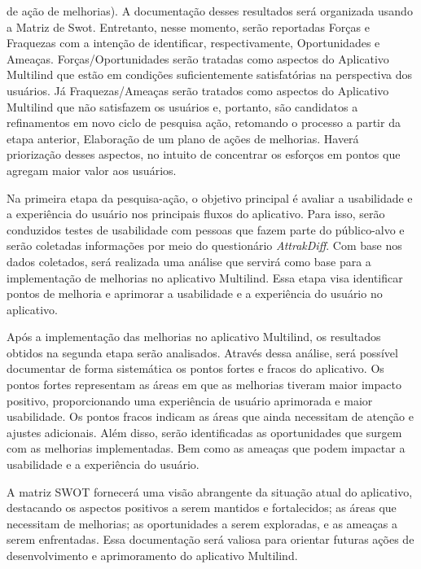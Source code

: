 \begin{itemize}
	de ação de melhorias). A documentação desses resultados será organizada usando a Matriz de Swot. Entretanto, nesse momento, serão reportadas Forças e Fraquezas com a intenção de identificar, respectivamente, Oportunidades e Ameaças. Forças/Oportunidades serão tratadas como aspectos do Aplicativo Multilind que estão em condições suficientemente satisfatórias na perspectiva dos usuários. Já Fraquezas/Ameaças serão tratados como aspectos do Aplicativo Multilind que não satisfazem os usuários e, portanto, são candidatos a refinamentos 
	em novo ciclo de pesquisa ação, retomando o processo a partir da etapa anterior, Elaboração de um plano de ações de melhorias. Haverá priorização desses aspectos, no intuito de concentrar os esforços em pontos que agregam maior valor aos usuários.
\end{itemize}

Na primeira etapa da pesquisa-ação, o objetivo principal é avaliar a usabilidade e a experiência do usuário nos principais fluxos do aplicativo. Para isso, serão conduzidos testes de usabilidade com pessoas que fazem parte do público-alvo e serão coletadas informações por meio do questionário \textit{AttrakDiff}. Com base nos dados coletados, será realizada uma análise que servirá como base para a implementação de melhorias no aplicativo Multilind. Essa etapa visa identificar pontos de melhoria e aprimorar a usabilidade e a experiência do 
usuário no aplicativo.

Após a implementação das melhorias no aplicativo Multilind, os resultados obtidos na segunda etapa serão analisados. Através dessa análise, será possível documentar de forma sistemática os pontos fortes e fracos do aplicativo. Os pontos fortes representam as áreas em que as melhorias tiveram maior impacto positivo, proporcionando uma experiência de usuário aprimorada e maior usabilidade. Os pontos fracos indicam as áreas que ainda necessitam de atenção e ajustes adicionais. Além disso, serão identificadas as oportunidades que surgem com as 
melhorias implementadas. Bem como as ameaças que podem impactar a usabilidade e a experiência do usuário.

A matriz SWOT fornecerá uma visão abrangente da situação atual do aplicativo, destacando os aspectos positivos a serem mantidos e fortalecidos; as áreas que necessitam de melhorias; as oportunidades a serem exploradas, e as ameaças a serem enfrentadas. Essa documentação será valiosa para orientar futuras ações de desenvolvimento e aprimoramento do aplicativo Multilind.

